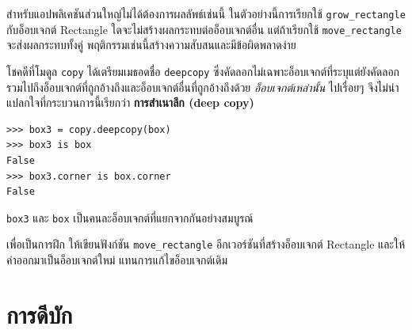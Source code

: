 
สำหรับแอปพลิเคชันส่วนใหญ่ไม่ได้ต้องการผลลัพธ์เช่นนี้ ในตัวอย่างนี้การเรียกใช้  \verb"grow_rectangle" 
กับอ็อบเจกต์ Rectangle ใดจะไม่สร้างผลกระทบต่ออ็อบเจกต์อื่น 
แต่ถ้าเรียกใช้ \verb"move_rectangle" จะส่งผลกระทบทั้งคู่ พฤติกรรมเช่นนี้สร้างความสับสนและมีข้อผิดพลาดง่าย


โชคดีที่โมดูล {\tt copy} ได้เตรียมเมธอดชื่อ {\tt deepcopy} ซึ่งคัดลอกไม่เฉพาะอ็อบเจกต์ที่ระบุแต่ยังคัดลอกรวมไปถึงอ็อบเจกต์ที่ถูกอ้างถึงและอ็อบเจกต์อื่นที่ถูกอ้างถึงด้วย {\em อ็อบเจกต์เหล่านั้น} ไปเรื่อยๆ 
จึงไม่น่าแปลกใจที่กระบวนการนี้เรียกว่า {\bf การสำเนาลึก (deep copy)}

\begin{verbatim}
>>> box3 = copy.deepcopy(box)
>>> box3 is box
False
>>> box3.corner is box.corner
False
\end{verbatim}
%

{\tt box3} และ {\tt box} เป็นคนละอ็อบเจกต์ที่แยกจากกันอย่างสมบูรณ์


เพื่อเป็นการฝึก ให้เขียนฟังก์ชัน \verb"move_rectangle" อีกเวอร์ชันที่สร้างอ็อบเจกต์ Rectangle และให้ค่าออกมาเป็นอ็อบเจกต์ใหม่ แทนการแก้ไขอ็อบเจกต์เดิม

\section{การดีบัก}
\label{hasattr}


